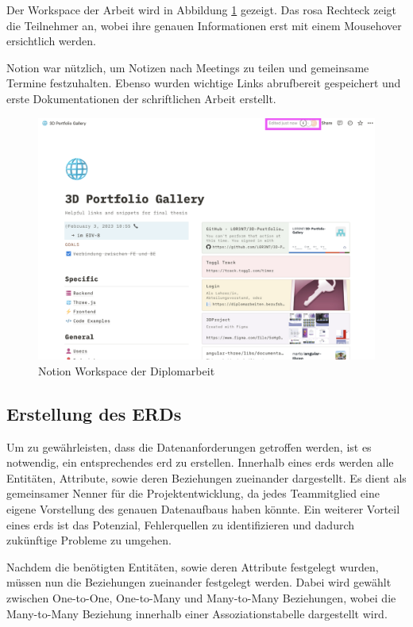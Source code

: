 Der Workspace der Arbeit wird in Abbildung \ref{fig:impl:notion-page} gezeigt.
Das rosa Rechteck zeigt die Teilnehmer an, wobei ihre genauen Informationen erst mit einem Mousehover ersichtlich werden. 

Notion war nützlich, um Notizen nach Meetings zu teilen und gemeinsame Termine festzuhalten.
Ebenso wurden wichtige Links abrufbereit gespeichert und erste Dokumentationen der schriftlichen Arbeit erstellt.

\begin{figure} [h t]
  \centering
  \includegraphics[scale=0.3]{pics/NotionPage.png}
  \caption{Notion Workspace der Diplomarbeit}
  \label{fig:impl:notion-page}
\end{figure}

\subsection{Erstellung des ERDs}
Um zu gewährleisten, dass die Datenanforderungen getroffen werden, ist es notwendig, ein entsprechendes \gls{erd} zu erstellen.
Innerhalb eines \gls{erd}s werden alle Entitäten, Attribute, sowie deren Beziehungen zueinander dargestellt.
Es dient als gemeinsamer Nenner für die Projektentwicklung, da jedes Teammitglied eine eigene Vorstellung des genauen Datenaufbaus haben könnte. 
Ein weiterer Vorteil eines \gls{erd}s ist das Potenzial, Fehlerquellen zu identifizieren und dadurch zukünftige Probleme zu umgehen. 

Nachdem die benötigten Entitäten, sowie deren Attribute festgelegt wurden, müssen nun die Beziehungen zueinander festgelegt werden. 
Dabei wird gewählt zwischen One-to-One, One-to-Many und Many-to-Many Beziehungen, wobei die Many-to-Many Beziehung innerhalb einer Assoziationstabelle dargestellt wird. 


